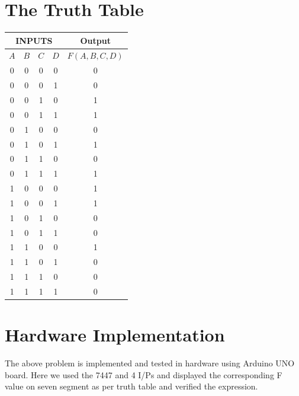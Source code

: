 \documentclass[a4paper,12pt]{article}
\begin{document}
\section*{\textbf{The Truth Table}}
\begin{center}
\begin{tabular}{|c|c|c|c|c|}
\hline
	\multicolumn{4}{|c|}{\textbf{INPUTS}} & \textbf{Output} \\ 
\hline
	$A$ & $B$ & $C$ & $D$ & $F(A,B,C,D)$ \\
\hline
0 & 0 & 0 & 0 & 0 \\ 
0 & 0 & 0 & 1 & 0 \\ 
0 & 0 & 1 & 0 & 1 \\ 
0 & 0 & 1 & 1 & 1 \\ 
0 & 1 & 0 & 0 & 0 \\ 
0 & 1 & 0 & 1 & 1 \\ 
0 & 1 & 1 & 0 & 0 \\ 
0 & 1 & 1 & 1 & 1 \\ 
1 & 0 & 0 & 0 & 1 \\ 
1 & 0 & 0 & 1 & 1 \\ 
1 & 0 & 1 & 0 & 0 \\ 
1 & 0 & 1 & 1 & 0 \\ 
1 & 1 & 0 & 0 & 1 \\ 
1 & 1 & 0 & 1 & 0 \\ 
1 & 1 & 1 & 0 & 0 \\ 
1 & 1 & 1 & 1 & 0 \\ 
\hline
\end{tabular}
\end{center}
\section*{\textbf{Hardware Implementation}}
The above problem is implemented and tested in hardware using Arduino UNO board. Here we used the 7447 and 4 I/Ps and displayed the corresponding F value on seven segment as per truth table and verified the expression.
\end{document}
